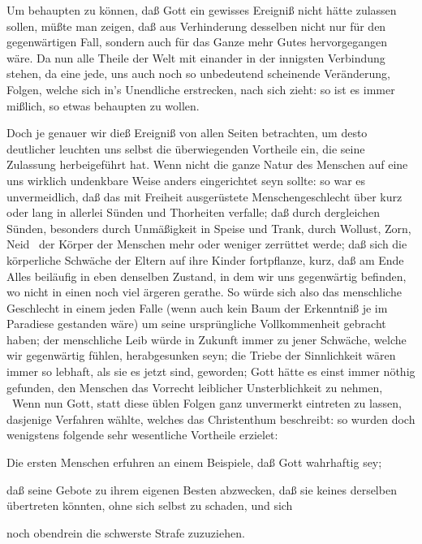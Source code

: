 \begin{aufza}
\item Um behaupten zu können, daß Gott ein gewisses Ereigniß nicht hätte zulassen sollen, müßte man zeigen, daß aus Verhinderung desselben nicht nur für den gegenwärtigen Fall, sondern auch für das Ganze mehr Gutes hervorgegangen wäre. Da nun alle Theile der Welt mit einander in der innigsten Verbindung stehen, da eine jede, uns auch noch so unbedeutend scheinende Veränderung, Folgen, welche sich in's Unendliche erstrecken, nach sich zieht: so ist es immer mißlich, so etwas behaupten zu wollen.
\item Doch je genauer wir dieß Ereigniß von allen Seiten betrachten, um desto deutlicher leuchten uns selbst die überwiegenden Vortheile ein, die seine Zulassung herbeigeführt hat. Wenn nicht die ganze Natur des Menschen auf eine uns wirklich undenkbare Weise anders eingerichtet seyn sollte: so war es unvermeidlich, daß das mit Freiheit ausgerüstete Menschengeschlecht über kurz oder lang in allerlei Sünden und Thorheiten verfalle; daß durch dergleichen Sünden, besonders durch Unmäßigkeit in Speise und Trank, durch Wollust, Zorn, Neid \udgl\  der Körper der Menschen mehr oder weniger zerrüttet werde; daß sich die körperliche Schwäche der Eltern auf ihre Kinder fortpflanze, kurz, daß am Ende Alles beiläufig in eben denselben Zustand, in dem wir uns gegenwärtig befinden, wo nicht in einen noch viel ärgeren gerathe. So würde sich also das menschliche Geschlecht in einem jeden Falle (wenn auch kein Baum der Erkenntniß je im Paradiese gestanden wäre) um seine ursprüngliche Vollkommenheit gebracht haben; der menschliche Leib würde in Zukunft immer zu jener Schwäche, welche wir gegenwärtig fühlen, herabgesunken seyn; die Triebe der Sinnlichkeit wären immer so lebhaft, als sie es jetzt sind, geworden; Gott hätte es einst immer nöthig gefunden, den Menschen das Vorrecht leiblicher Unsterblichkeit zu nehmen, \usw\ Wenn nun Gott, statt diese üblen Folgen ganz unvermerkt eintreten zu lassen, dasjenige Verfahren wählte, welches das Christenthum beschreibt: so wurden doch wenigstens folgende sehr wesentliche Vortheile erzielet:
\begin{aufzb}
\item Die ersten Menschen erfuhren an einem Beispiele, daß Gott wahrhaftig sey;
\item daß seine Gebote zu ihrem eigenen Besten abzwecken, daß sie keines derselben übertreten könnten, ohne sich selbst zu schaden, und sich
\item noch obendrein die schwerste Strafe zuzuziehen.

\end{aufzb}
\end{aufza}
